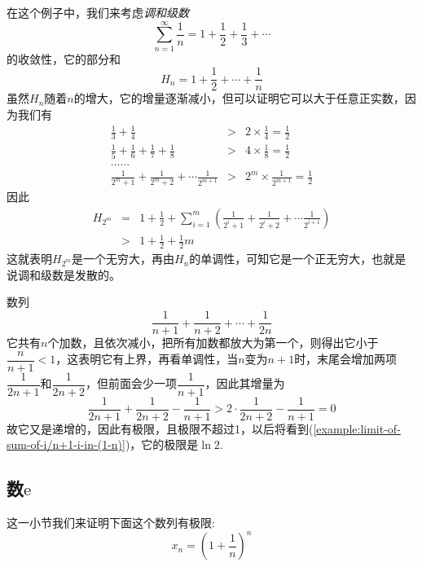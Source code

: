 \begin{example}[调和级数的发散性]
  \label{example:non-convergency-of-harmonic-series-proof-by-monotone}
  在这个例子中，我们来考虑\emph{调和级数}
  \[ \sum_{n=1}^{\infty} \frac{1}{n} = 1+\frac{1}{2} + \frac{1}{3} + \cdots  \]
  的收敛性，它的部分和
  \[ H_n = 1 + \frac{1}{2} + \cdots + \frac{1}{n} \]
  虽然$H_n$随着$n$的增大，它的增量逐渐减小，但可以证明它可以大于任意正实数，因为我们有
  \begin{eqnarray*}
    \frac{1}{3} + \frac{1}{4} & > & 2 \times \frac{1}{4} = \frac{1}{2} \\
    \frac{1}{5} + \frac{1}{6} + \frac{1}{7} + \frac{1}{8} & > & 4 \times \frac{1}{8} = \frac{1}{2} \\
    ...... && \\
    \frac{1}{2^m+1} + \frac{1}{2^m+2} + \cdots \frac{1}{2^{m+1}} & > & 2^m \times \frac{1}{2^{m+1}} = \frac{1}{2}
  \end{eqnarray*}
  因此
  \begin{eqnarray*}
    H_{2^m} & = & 1+ \frac{1}{2} + \sum_{i=1}^m \left( \frac{1}{2^i+1} + \frac{1}{2^i+2} + \cdots \frac{1}{2^{i+1}} \right) \\
    & > & 1 + \frac{1}{2} + \frac{1}{2}m
  \end{eqnarray*}
  这就表明$H_{2^m}$是一个无穷大，再由$H_n$的单调性，可知它是一个正无穷大，也就是说调和级数是发散的。
\end{example}

\begin{example}
  数列
  \[ \frac{1}{n+1}+\frac{1}{n+2}+\cdots+\frac{1}{2n} \]
  它共有$n$个加数，且依次减小，把所有加数都放大为第一个，则得出它小于$\dfrac{n}{n+1}<1$，这表明它有上界，再看单调性，当$n$变为$n+1$时，末尾会增加两项$\dfrac{1}{2n+1}$和$\dfrac{1}{2n+2}$，但前面会少一项$\dfrac{1}{n+1}$，因此其增量为
  \[ \frac{1}{2n+1}+\frac{1}{2n+2}-\frac{1}{n+1} > 2 \cdot \frac{1}{2n+2} - \frac{1}{n+1} = 0 \]
  故它又是递增的，因此有极限，且极限不超过1，以后将看到(\autoref{example:limit-of-sum-of-i/n+1-i-in-(1-n)})，它的极限是$\ln{2}$.
\end{example}

\subsection{数$\mathrm{e}$}
\label{sec:a-import-sequence-limit}

这一小节我们来证明下面这个数列有极限:
\[ x_n=\left( 1+\frac{1}{n} \right)^n \]

